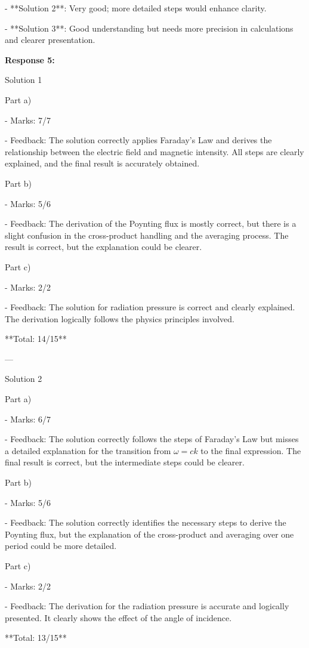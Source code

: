 \documentclass[a4paper,11pt]{article}
\begin{document}
- **Solution 2**: Very good; more detailed steps would enhance clarity.

- **Solution 3**: Good understanding but needs more precision in calculations and clearer presentation.

\bigskip
\textbf{Response 5:}

Solution 1

Part a)

- Marks: 7/7

- Feedback: The solution correctly applies Faraday's Law and derives the relationship between the electric field and magnetic intensity. All steps are clearly explained, and the final result is accurately obtained.

Part b)

- Marks: 5/6

- Feedback: The derivation of the Poynting flux is mostly correct, but there is a slight confusion in the cross-product handling and the averaging process. The result is correct, but the explanation could be clearer.

Part c)

- Marks: 2/2

- Feedback: The solution for radiation pressure is correct and clearly explained. The derivation logically follows the physics principles involved.

**Total: 14/15**

---

Solution 2

Part a)

- Marks: 6/7

- Feedback: The solution correctly follows the steps of Faraday's Law but misses a detailed explanation for the transition from \(\omega = ck\) to the final expression. The final result is correct, but the intermediate steps could be clearer.

Part b)

- Marks: 5/6

- Feedback: The solution correctly identifies the necessary steps to derive the Poynting flux, but the explanation of the cross-product and averaging over one period could be more detailed.

Part c)

- Marks: 2/2

- Feedback: The derivation for the radiation pressure is accurate and logically presented. It clearly shows the effect of the angle of incidence.

**Total: 13/15**
\end{document}
